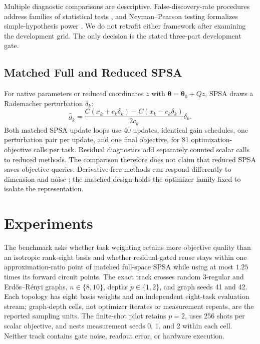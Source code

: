 \documentclass[aps,prx,reprint,superscriptaddress,floatfix]{revtex4-2}
\begin{document}
Multiple diagnostic comparisons are descriptive.  False-discovery-rate
procedures address families of statistical tests \citep{benjamini1995controlling},
and Neyman--Pearson testing formalizes simple-hypothesis power
\citep{neyman1933efficient}.  We do not retrofit either framework after
examining the development grid.  The only decision is the stated three-part
development gate.

\subsection{Matched Full and Reduced SPSA}

For native parameters or reduced coordinates $z$ with
$\bm\theta=\bm\theta_0+Qz$, SPSA draws a Rademacher perturbation $\delta_k$:
\begin{equation}
 \widehat g_k =
 \frac{C(x_k+c_k\delta_k)-C(x_k-c_k\delta_k)}
 {2c_k}\delta_k .
 \label{eq:spsa}
\end{equation}
Both matched SPSA update loops use 40 updates, identical gain schedules, one
perturbation pair per update, and one final objective, for 81
optimization-objective calls per task.  Residual diagnostics add separately
counted scalar calls to reduced methods.  The comparison therefore does not
claim that reduced SPSA saves objective queries.  Derivative-free methods can
respond differently to dimension and noise
\citep{audet2006mesh,hansen2001cma}; the matched design holds the optimizer
family fixed to isolate the representation.

\section{Experiments}

The benchmark asks whether task weighting retains more objective quality than
an isotropic rank-eight basis and whether residual-gated reuse stays within
one approximation-ratio point of matched full-space SPSA while using at most
$1.25$ times its forward circuit points.  The exact track crosses random
3-regular and Erd\H{o}s--R\'enyi graphs, $n\in\{8,10\}$, depths
$p\in\{1,2\}$, and graph seeds 41 and 42.  Each topology has eight basis
weights and an independent eight-task evaluation stream; graph-depth cells,
not optimizer iterates or measurement repeats, are the reported sampling
units.  The finite-shot pilot retains $p=2$, uses 256 shots per scalar
objective, and nests measurement seeds 0, 1, and 2 within each cell.  Neither
track contains gate noise, readout error, or hardware execution.
\end{document}
